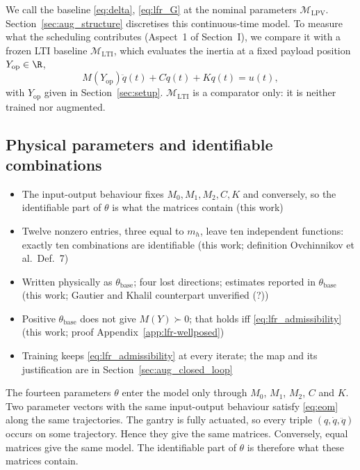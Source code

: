 We call the baseline \eqref{eq:delta}, \eqref{eq:lfr_G} at the nominal
parameters $\mathcal M_{\mathrm{LPV}}$.
Section~\ref{sec:aug_structure} discretises this continuous-time model.
To measure what the scheduling contributes (Aspect~1 of Section~I), we compare it with a frozen LTI
baseline $\mathcal M_{\mathrm{LTI}}$, which evaluates the inertia at a fixed
payload position $Y_{\mathrm{op}}\in\R$,
\begin{equation}
  M(Y_{\mathrm{op}})\ddot q(t)+C\dot q(t)+Kq(t)=u(t),
  \label{eq:lti}
\end{equation}
with $Y_{\mathrm{op}}$ given in Section~\ref{sec:setup}.
$\mathcal M_{\mathrm{LTI}}$ is a comparator only: it is neither trained nor
augmented.

\subsection{Physical parameters and identifiable combinations}\label{sec:params}
\ifdraft
\begin{itemize}
\item The input-output behaviour fixes $M_0,M_1,M_2,C,K$ and conversely, so the identifiable part of $\theta$ is what the matrices contain (this work)
\item Twelve nonzero entries, three equal to $m_h$, leave ten independent functions: exactly ten combinations are identifiable (this work; definition Ovchinnikov et al.\ Def.~7)
\item Written physically as $\theta_{\mathrm{base}}$; four lost directions; estimates reported in $\theta_{\mathrm{base}}$ (this work; Gautier and Khalil counterpart unverified (?))
\item Positive $\theta_{\mathrm{base}}$ does not give $M(Y)\succ0$; that holds iff \eqref{eq:lfr_admissibility} (this work; proof Appendix~\ref{app:lfr-wellposed})
\item Training keeps \eqref{eq:lfr_admissibility} at every iterate; the map and its justification are in Section~\ref{sec:aug_closed_loop}
\end{itemize}
\fi
The fourteen parameters $\theta$ enter the model only through $M_0$, $M_1$,
$M_2$, $C$ and $K$.
Two parameter vectors with the same input-output behaviour satisfy
\eqref{eq:eom} along the same trajectories.
The gantry is fully actuated, so every triple $(q,\dot q,\ddot q)$ occurs on
some trajectory.
Hence they give the same matrices.
Conversely, equal matrices give the same model.
The identifiable part of $\theta$ is therefore what these matrices contain.

